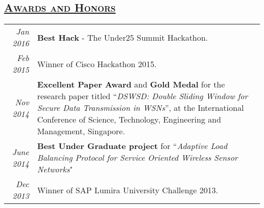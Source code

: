 \documentclass[14pt]{article}
\begin{document}
\subsection* {\scshape\LARGE\uline {Awards and Honors}}
\begin{tabularx}{\textwidth}{r X}
\emph{Jan 2016} &  \textbf{Best Hack} - The Under25 Summit Hackathon.\\
\emph{Feb 2015} & Winner of Cisco Hackathon 2015.\\
\emph{Nov 2014} & \textbf{Excellent Paper Award} and \textbf{Gold Medal} for the research paper  titled ``\emph{DSWSD: Double Sliding Window for Secure Data Transmission in WSNs}'', at the International Conference of Science, Technology, Engineering and Management, Singapore. \\ 
\emph{June 2014} & \textbf{Best Under Graduate project} for ``\emph{Adaptive Load Balancing Protocol for Service Oriented Wireless Sensor Networks}" \\ 
\emph{Dec 2013} & Winner of SAP Lumira University Challenge 2013. \\ 
\end{tabularx}
\end{document}
